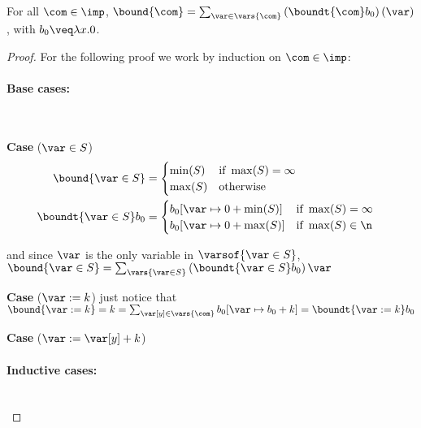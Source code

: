\begin{lemma}\label{le:computebounds}
  For all \(\com \in \imp\),
  \(\bound{\com}=\sum_{\var\in \vars{\com}}
  \left(\boundt{\com}b_0\right)(\var)\), with \(b_0\veq \lambda x.0\).
\end{lemma}
\begin{proof}
  For the following proof we work by induction on \(\com\in \imp\):

  \paragraph*{Base cases:} \mbox{} \\
  
  \medskip

  \textbf{Case} (\(\var \in S\))
  \begin{align*}
    \bound{\var\in S} & = \begin{cases}
      \min(S) & \text{if } \max(S) = \infty \\
      \max(S) & \text{otherwise}
    \end{cases} & \\
    \boundt{\var \in S}b_0 & = \begin{cases}
      b_0[\var \mapsto 0 + \min(S)] & \text{if } \max(S) = \infty \\
      b_0[\var \mapsto 0 + \max(S)] & \text{if } \max(S) \in \n
    \end{cases} &
  \end{align*}
  
  and since \(\var\) is the only variable in \(\varsof{\var \in S}\),
  \(\bound{\var\in S} = \sum_{\vars{\var \in S}}\left(\boundt{\var \in
      S}b_0\right)\var\)
  
  \medskip
  
  \textbf{Case} (\(\var := k\))
  just notice that
  \(\bound{\var := k} = k = \sum_{\var[y] \in \vars{\com}} b_0[\var \mapsto b_0 + k]
  = \boundt{\var := k }b_0\)

  \medskip

  \textbf{Case} (\(\var := \var[y] + k\))
  
  \medskip

  \noindent
  \paragraph*{Inductive cases:}\mbox{}\\
  
  \medskip
  

\end{proof}
